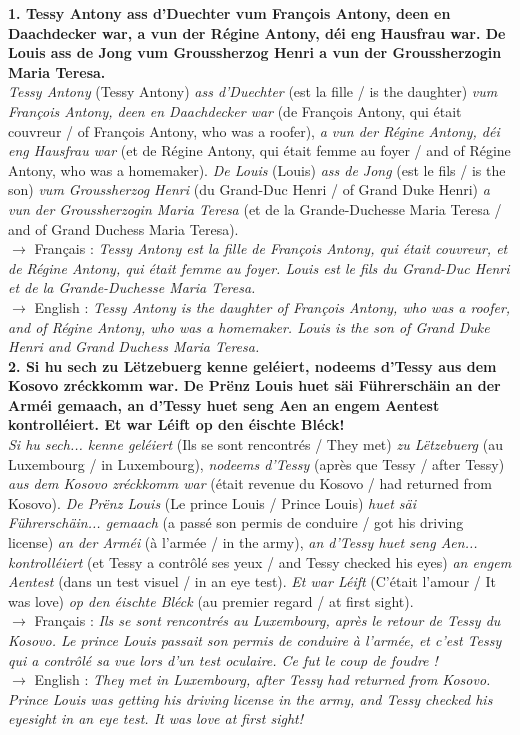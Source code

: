 \noindent\textbf{1. Tessy Antony ass d'Duechter vum François Antony, deen en Daachdecker war, a vun der Régine Antony, déi eng Hausfrau war. De Louis ass de Jong vum Groussherzog Henri a vun der Groussherzogin Maria Teresa.}\\
\textit{Tessy Antony} (Tessy Antony) \textit{ass d'Duechter} (est la fille / is the daughter) \textit{vum François Antony, deen en Daachdecker war} (de François Antony, qui était couvreur / of François Antony, who was a roofer), \textit{a vun der Régine Antony, déi eng Hausfrau war} (et de Régine Antony, qui était femme au foyer / and of Régine Antony, who was a homemaker). \textit{De Louis} (Louis) \textit{ass de Jong} (est le fils / is the son) \textit{vum Groussherzog Henri} (du Grand-Duc Henri / of Grand Duke Henri) \textit{a vun der Groussherzogin Maria Teresa} (et de la Grande-Duchesse Maria Teresa / and of Grand Duchess Maria Teresa).\\
$\rightarrow$ Français : \textit{Tessy Antony est la fille de François Antony, qui était couvreur, et de Régine Antony, qui était femme au foyer. Louis est le fils du Grand-Duc Henri et de la Grande-Duchesse Maria Teresa.}\\
$\rightarrow$ English : \textit{Tessy Antony is the daughter of François Antony, who was a roofer, and of Régine Antony, who was a homemaker. Louis is the son of Grand Duke Henri and Grand Duchess Maria Teresa.}\\[0.5em]

\noindent\textbf{2. Si hu sech zu Lëtzebuerg kenne geléiert, nodeems d'Tessy aus dem Kosovo zréckkomm war. De Prënz Louis huet säi Führerschäin an der Arméi gemaach, an d'Tessy huet seng Aen an engem Aentest kontrolléiert. Et war Léift op den éischte Bléck!}\\
\textit{Si hu sech... kenne geléiert} (Ils se sont rencontrés / They met) \textit{zu Lëtzebuerg} (au Luxembourg / in Luxembourg), \textit{nodeems d'Tessy} (après que Tessy / after Tessy) \textit{aus dem Kosovo zréckkomm war} (était revenue du Kosovo / had returned from Kosovo). \textit{De Prënz Louis} (Le prince Louis / Prince Louis) \textit{huet säi Führerschäin... gemaach} (a passé son permis de conduire / got his driving license) \textit{an der Arméi} (à l'armée / in the army), \textit{an d'Tessy huet seng Aen... kontrolléiert} (et Tessy a contrôlé ses yeux / and Tessy checked his eyes) \textit{an engem Aentest} (dans un test visuel / in an eye test). \textit{Et war Léift} (C'était l'amour / It was love) \textit{op den éischte Bléck} (au premier regard / at first sight).\\
$\rightarrow$ Français : \textit{Ils se sont rencontrés au Luxembourg, après le retour de Tessy du Kosovo. Le prince Louis passait son permis de conduire à l'armée, et c'est Tessy qui a contrôlé sa vue lors d'un test oculaire. Ce fut le coup de foudre !}\\
$\rightarrow$ English : \textit{They met in Luxembourg, after Tessy had returned from Kosovo. Prince Louis was getting his driving license in the army, and Tessy checked his eyesight in an eye test. It was love at first sight!}\\[0.5em]

